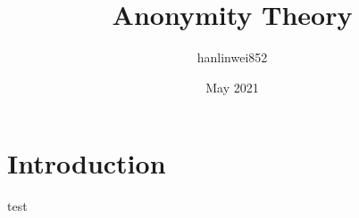 \documentclass{article}
\title{Anonymity Theory}
\author{hanlinwei852 }
\date{May 2021}
\begin{document}
\maketitle

\section{Introduction}
test
\end{document}
